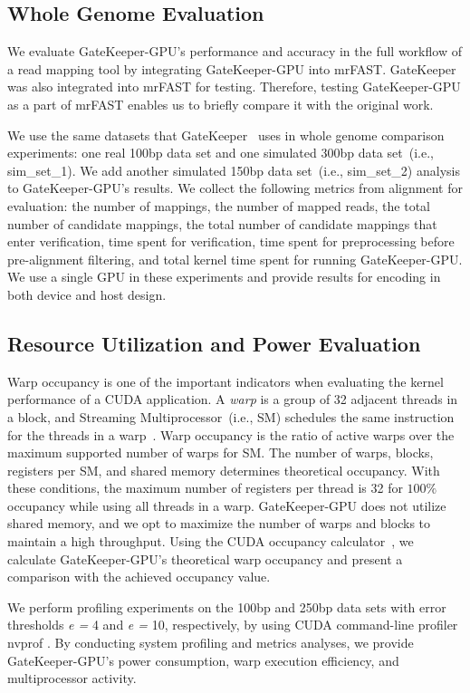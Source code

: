 \subsection{Whole Genome Evaluation} 
We evaluate GateKeeper-GPU's performance and accuracy in the full workflow of a read mapping tool by integrating GateKeeper-GPU into mrFAST. GateKeeper was also integrated into mrFAST for testing. Therefore, testing GateKeeper-GPU as a part of mrFAST enables us to briefly compare it with the original work. 

We use the same datasets that GateKeeper~\cite{Alser2017} uses in whole genome comparison experiments: one real 100bp data set and one simulated 300bp data set~(i.e., sim\_set\_1). We add another simulated 150bp data set~(i.e., sim\_set\_2) analysis to GateKeeper-GPU's results. We collect the following metrics from alignment for evaluation: the number of mappings, the number of mapped reads, the total number of candidate mappings, the total number of candidate mappings that enter verification, time spent for verification, time spent for preprocessing before pre-alignment filtering, and total kernel time spent for running GateKeeper-GPU. We use a single GPU in these experiments and provide results for encoding in both device and host design. 
\subsection{Resource Utilization and Power Evaluation} 
Warp occupancy is one of the important indicators when evaluating the kernel performance of a CUDA application. A \textit{warp} is a group of 32 adjacent threads in a block, and Streaming Multiprocessor~(i.e., SM) schedules the same instruction for the threads in a warp~\cite{achieved_occupancy}. Warp occupancy is the ratio of active warps over the maximum supported number of warps for SM. The number of warps, blocks, registers per SM, and shared memory determines theoretical occupancy. With these conditions, the maximum number of registers per thread is 32 for $100\%$ occupancy while using all threads in a warp. GateKeeper-GPU does not utilize shared memory, and we opt to maximize the number of warps and blocks to maintain a high throughput. Using the CUDA occupancy calculator~\cite{cudaoccupancycalculator}, we calculate GateKeeper-GPU's theoretical warp occupancy and present a comparison with the achieved occupancy value. 

We perform profiling experiments on the 100bp and 250bp data sets with error thresholds \textit{e = }4 and \textit{e = }10, respectively, by using CUDA command-line profiler nvprof \cite{nvprof}. By conducting system profiling and metrics analyses, we provide GateKeeper-GPU's power consumption, warp execution efficiency, and multiprocessor activity.